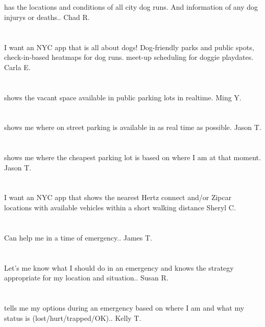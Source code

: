 \section{}has the locations and conditions of all city dog runs. And information of any dog injurys  or deaths.. Chad R.
\section{}I want an NYC app that is all about dogs! Dog-friendly parks and public spots,  check-in-based heatmaps for dog runs.  meet-up scheduling for doggie playdates.  Carla E.
\section{} shows the vacant  space available in public parking lots in realtime. Ming Y.
\section{}shows me where on street parking is available in as real time as possible. Jason  T.
\section{}shows me where the cheapest parking lot is based on where I am at that moment. Jason  T.
\section{}I want an NYC app that shows the nearest Hertz connect and/or Zipcar locations with available vehicles within a short walking distance   Sheryl C.
\section{} Can help me in a time of emergency.. James T.
\section{} Let's me know what I should do in an emergency and knows the strategy appropriate for my location and situation.. Susan R.
\section{} tells me my options during an emergency based on where I am and what my status is (lost/hurt/trapped/OK).. Kelly T.
